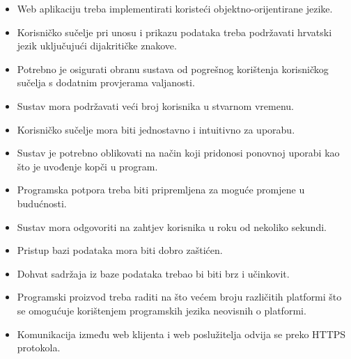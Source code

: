 			\begin{itemize}
				\item Web aplikaciju treba implementirati koristeći objektno-orijentirane jezike.
				\item Korisničko sučelje pri unosu i prikazu podataka treba podržavati hrvatski jezik uključujući dijakritičke znakove. 
				\item Potrebno je osigurati obranu sustava od pogrešnog korištenja korisničkog sučelja s dodatnim provjerama valjanosti.
				\item Sustav mora podržavati veći broj korisnika u stvarnom vremenu.
				\item Korisničko sučelje mora biti jednostavno i intuitivno za uporabu.
				\item Sustav je potrebno oblikovati na način koji pridonosi ponovnoj uporabi kao što je uvođenje kopči u program. 
				\item Programska potpora treba biti pripremljena za moguće promjene u budućnosti. 
				\item Sustav mora odgovoriti na zahtjev korisnika u roku od nekoliko sekundi. 
				\item Pristup bazi podataka mora biti dobro zaštićen. 
				\item Dohvat sadržaja iz baze podataka trebao bi biti brz i učinkovit. 
				\item Programski proizvod treba raditi na što većem broju različitih platformi što se omogućuje korištenjem programskih jezika neovisnih o platformi.
				\item Komunikacija između web klijenta i web poslužitelja odvija se preko HTTPS protokola. 
			\end{itemize}
		 
			 
			 
			 
	
